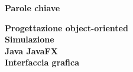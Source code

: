 
\clearemptydoublepage
\thispagestyle{empty}
\vspace*{20ex}
\begin{flushright}
    \begin{LARGE}
        \textbf{Parole chiave}\\
        \vspace{5ex}
    \end{LARGE}
    \begin{normalsize}
        \textbf{%
            Progettazione object-oriented\\%
            \medskip
            Simulazione\\%
            \medskip
            Java
            \medskip
            JavaFX\\%
            \medskip
            Interfaccia grafica%
        }
    \end{normalsize}
\end{flushright}
\vfill
